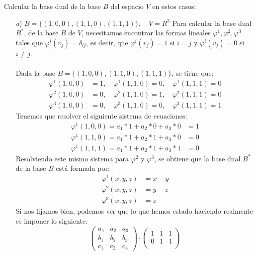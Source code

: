 \begin{ejercicio}
	Calcular la base dual de la base $B$ del espacio $V$ en estos casos:
	\begin{itemize}
		\item[\textit{a})] $B = \{(1,0,0),(1,1,0),(1,1,1)\}, \quad V = R^3$
			Para calcular la base dual $B^{*}$, de la base $B$ de $V$, necesitamos encontrar las formas lineales $\varphi^1,\varphi^2,\varphi^3$
			tales que $\varphi^i(v_j) = \delta_{ij}$, es decir, que $\varphi^i(v_j) = 1$ si $i=j$ y $\varphi^i(v_j) = 0$ si $i \neq j$. \\ \\
			Dada la base $B=\{(1,0,0),(1,1,0),(1,1,1)\}$, se tiene que:
			\begin{align*}
				\varphi^1(1,0,0) & = 1, \quad \varphi^1(1,1,0) = 0, \quad \varphi^1(1,1,1) = 0 \\
				\varphi^2(1,0,0) & = 0, \quad \varphi^2(1,1,0) = 1, \quad \varphi^2(1,1,1) = 0 \\
				\varphi^3(1,0,0) & = 0, \quad \varphi^3(1,1,0) = 0, \quad \varphi^3(1,1,1) = 1
			\end{align*}
			Tenemos que resolver el siguiente sistema de ecuaciones:
			\begin{align*}
				\varphi^1(1,0,0)= a_1 * 1 + a_2 * 0 + a_3 * 0 & = 1 \\
				\varphi^1(1,1,0)= a_1 * 1 + a_2 * 1 + a_3 * 0 & = 0 \\
				\varphi^1(1,1,1)= a_1 * 1 + a_2 * 1 + a_3 * 1 & = 0
			\end{align*}
			Resolviendo este mismo sistema para $\varphi^2$ y $\varphi^3$, se obtiene que la base dual $B^{*}$ de la base $B$ está formada por:
			\begin{align*}
				\varphi^1 (x,y,z) & = x-y \\
				\varphi^2 (x,y,z) & = y-z \\
				\varphi^3 (x,y,z) & = z
			\end{align*}
			Si nos fijamos bien, podemos ver que lo que hemos estado haciendo realmente es imponer lo siguiente:
			\begin{equation*}
				\begin{pmatrix}
					a_1 & a_2 & a_3 \\
					b_1 & b_2 & b_3 \\
					c_1 & c_2 & c_3
				\end{pmatrix} \cdot \begin{pmatrix}
					1 & 1 & 1 \\
					0 & 1 & 1 \\

\end{pmatrix}
\end{equation*}
\end{itemize}
\end{ejercicio}
